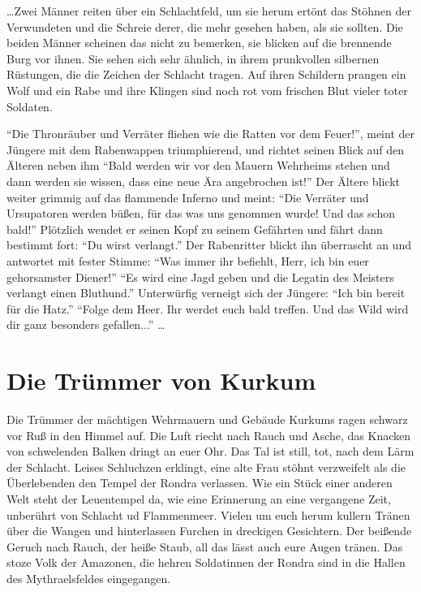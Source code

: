 \dots Zwei Männer reiten über ein Schlachtfeld, um sie herum ertönt das Stöhnen der Verwundeten und die Schreie derer, die mehr gesehen haben, als sie sollten. Die beiden Männer scheinen das nicht zu bemerken, sie blicken auf die brennende Burg vor ihnen. Sie sehen sich sehr ähnlich, in ihrem prunkvollen silbernen Rüstungen, die die Zeichen der Schlacht tragen. Auf ihren Schildern prangen ein Wolf und ein Rabe und ihre Klingen sind noch rot vom frischen Blut vieler toter Soldaten.

``Die Thronräuber und Verräter fliehen wie die Ratten vor dem Feuer!'', meint der Jüngere mit dem Rabenwappen triumphierend, und richtet seinen Blick auf den Älteren neben ihm ``Bald werden wir vor den Mauern Wehrheims stehen und dann werden sie wissen, dass eine neue Ära angebrochen ist!'' Der Ältere blickt weiter grimmig auf das flammende Inferno und meint: ``Die Verräter und Ursupatoren werden büßen, für das was uns genommen wurde! Und das schon bald!'' Plötzlich wendet er seinen Kopf zu seinem Gefährten und fährt dann bestimmt fort: ``Du wirst verlangt.'' Der Rabenritter blickt ihn überrascht an und antwortet mit fester Stimme: ``Was immer ihr befiehlt, Herr, ich bin euer gehorsamster Diener!'' ``Es wird eine Jagd geben und die Legatin des Meisters verlangt einen Bluthund.'' Unterwürfig verneigt sich der Jüngere: ``Ich bin bereit für die Hatz.'' ``Folge dem Heer. Ihr werdet euch bald treffen. Und das Wild wird dir ganz besonders gefallen...'' \dots

\section{Die Trümmer von Kurkum}

Die Trümmer der mächtigen Wehrmauern und Gebäude Kurkums ragen schwarz vor Ruß in den Himmel auf. Die Luft riecht nach Rauch und Asche, das Knacken von schwelenden Balken dringt an euer Ohr. Das Tal ist still, tot, nach dem Lärm der Schlacht. Leises Schluchzen erklingt, eine alte Frau stöhnt verzweifelt als die Überlebenden den Tempel der Rondra verlassen. Wie ein Stück einer anderen Welt steht der Leuentempel da, wie eine Erinnerung an eine vergangene Zeit, unberührt von Schlacht ud Flammenmeer. Vielen um euch herum kullern Tränen über die Wangen und hinterlassen Furchen in dreckigen Gesichtern. Der beißende Geruch nach Rauch, der heiße Staub, all das lässt auch eure Augen tränen. Das stoze Volk der Amazonen, die hehren Soldatinnen der Rondra sind in die Hallen des Mythraelsfeldes eingegangen.

